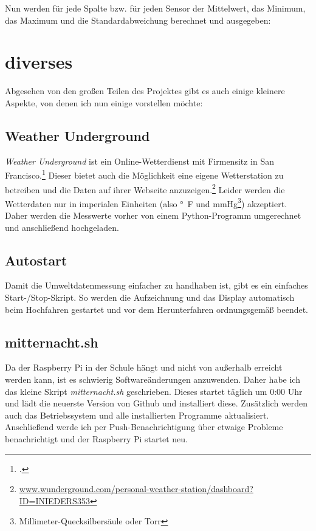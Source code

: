 
Nun werden für jede Spalte bzw. für jeden Sensor der Mittelwert, das Minimum, das Maximum und die \gls{Standardabweichung} berechnet und ausgegeben:


\section{diverses}
\label{sec:diverses}

Abgesehen von den großen Teilen des Projektes gibt es auch einige kleinere Aspekte, von denen ich nun einige vorstellen möchte:

\subsection{Weather Underground}
\label{subsec:wunderground}

\emph{Weather Underground} ist ein Online-Wetterdienst mit Firmensitz in San Francisco.\footcite{wiki:wunderground} Dieser bietet auch die Möglichkeit eine eigene Wetterstation zu betreiben und die Daten auf ihrer Webseite anzuzeigen.\footnote{\href{http://www.wunderground.com/personal-weather-station/dashboard?ID=INIEDERS353}{www.wunderground.com/personal-weather-station/dashboard?ID=INIEDERS353}}
Leider werden die Wetterdaten nur in imperialen Einheiten (also \si{\degree F} und \si{\mmHg}\footnote{Millimeter-Quecksilbersäule oder Torr}) akzeptiert. Daher werden die Messwerte vorher von einem \gls{Python}-Programm umgerechnet und anschließend hochgeladen.

\subsection{Autostart}
\label{subsec:Autostart}

Damit die Umweltdatenmessung einfacher zu handhaben ist, gibt es ein einfaches Start-/Stop-Skript. So werden die Aufzeichnung und das Display automatisch beim Hochfahren gestartet und vor dem Herunterfahren ordnungsgemäß beendet.

\subsection{mitternacht.sh}
\label{subsec:mitternacht.sh}

Da der Raspberry Pi in der Schule hängt und nicht von außerhalb erreicht werden kann, ist es schwierig Softwareänderungen anzuwenden. Daher habe ich das kleine Skript \emph{mitternacht.sh} geschrieben. Dieses startet täglich um 0:00 Uhr und lädt die neuerste Version von \gls{Github} und installiert diese. Zusätzlich werden auch das Betriebssystem und alle installierten Programme aktualisiert. Anschließend werde ich per Push-Benachrichtigung über etwaige Probleme benachrichtigt und der Raspberry Pi startet neu.

